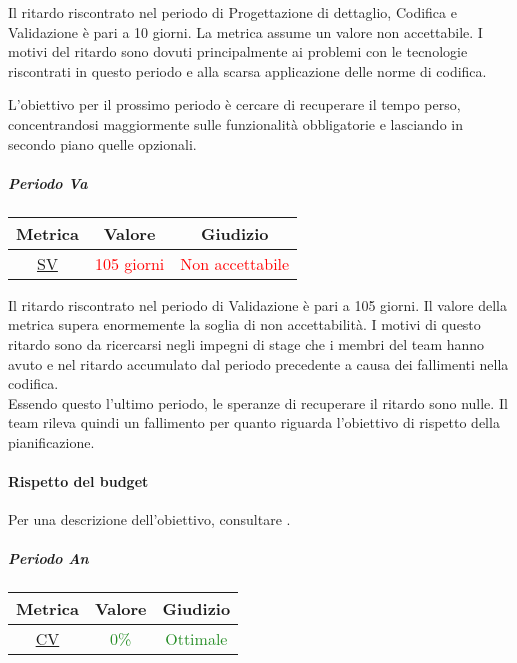 					Il ritardo riscontrato nel periodo di Progettazione di dettaglio, Codifica e Validazione è pari a 10 giorni. La metrica assume un valore non accettabile.
					I motivi del ritardo sono dovuti principalmente ai problemi con le tecnologie riscontrati in questo periodo e alla scarsa applicazione delle norme di codifica.
					
					
					L'obiettivo per il prossimo periodo è cercare di recuperare il tempo perso, concentrandosi maggiormente sulle funzionalità obbligatorie e lasciando in secondo piano quelle opzionali.
					
					\subparagraph{Periodo Va}
					
					\begin{table}[H]
						\centering
						\begin{tabular}{  c | c | c}
							\hline
							\textbf{Metrica} & \textbf{Valore} & \textbf{Giudizio} \\
							\hline
							\hyperref[MRDB]{SV}    & \textcolor{Red}{105 giorni}      & \textcolor{Red}{Non accettabile}  \\\hline
						\end{tabular}
					\end{table}
					
					Il ritardo riscontrato nel periodo di Validazione è pari a 105 giorni. Il valore della metrica supera enormemente la soglia di non accettabilità. I motivi di questo ritardo sono da ricercarsi negli impegni di stage che i membri del team hanno avuto e nel ritardo accumulato dal periodo precedente a causa dei fallimenti nella codifica. \\
					Essendo questo l'ultimo periodo, le speranze di recuperare il ritardo sono nulle. Il team rileva quindi un fallimento per quanto riguarda l'obiettivo di rispetto della pianificazione.
					
					\newpage
			\paragraph{Rispetto del budget}
			\label{RRDB}
			Per una descrizione dell'obiettivo, consultare .
				\subparagraph{Periodo An}
					\begin{table}[H]
						\centering
							\begin{tabular}{  c | c | c}
								\hline
									\textbf{Metrica} & \textbf{Valore} & \textbf{Giudizio} \\
								\hline
								    \hyperref[MRDB]{CV}    & \textcolor{ForestGreen}{0\%}      & \textcolor{ForestGreen}{Ottimale}  \\\hline
							\end{tabular}
					\end{table}
			
